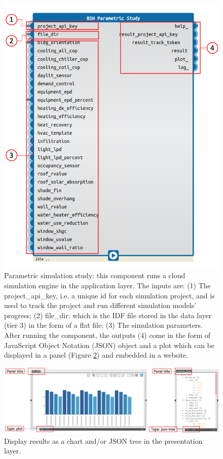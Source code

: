 \documentclass{scsSimAUDPaperFormat}
\begin{document}
\begin{figure}[h]
\includegraphics[width=\columnwidth]{paper_LateX/imgs/bsh_param.png}
\caption{ Parametric simulation study: this component runs a cloud simulation engine in the application layer. The inputs are: (1) The project\_api\_key, i.e. a unique id for each simulation project, and is used to track the project and run different simulation models' progress; (2) file\_dir: which is the IDF file stored in the data layer (tier 3) in the form of a flat file; (3) The simulation parameters. After running the component, the outputs (4) come in the form of JavaScript Object Notation (JSON) object and a plot which can be displayed in a panel (Figure \ref{fig:plot_panel}) and embedded in a website.}
\label{fig:parametric_study}
\end{figure}

\begin{figure}[h]
\includegraphics[width=\columnwidth]{paper_LateX/imgs/display_data_plot_json.png}
\caption{ Display results as a chart and/or JSON tree in the presentation layer.}
\label{fig:plot_panel}
\end{figure}
\end{document}
